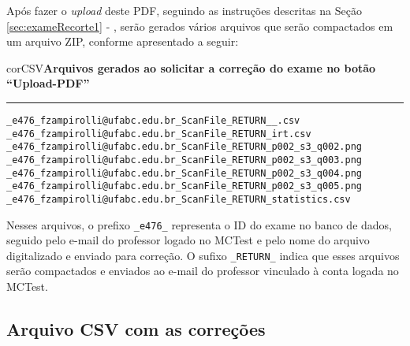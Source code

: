 
Após fazer o \textit{upload} deste PDF, seguindo as instruções descritas na Seção \ref{sec:exameRecorte1} - , serão gerados vários arquivos que serão compactados em um arquivo ZIP, conforme apresentado a seguir:

\begin{myboxCode}{corCSV}{\textbf{Arquivos gerados ao solicitar a correção do exame no botão ``Upload-PDF''}}\vspace{3mm}
\hrule
\begin{verbatim}
_e476_fzampirolli@ufabc.edu.br_ScanFile_RETURN__.csv
_e476_fzampirolli@ufabc.edu.br_ScanFile_RETURN_irt.csv
_e476_fzampirolli@ufabc.edu.br_ScanFile_RETURN_p002_s3_q002.png
_e476_fzampirolli@ufabc.edu.br_ScanFile_RETURN_p002_s3_q003.png
_e476_fzampirolli@ufabc.edu.br_ScanFile_RETURN_p002_s3_q004.png
_e476_fzampirolli@ufabc.edu.br_ScanFile_RETURN_p002_s3_q005.png
_e476_fzampirolli@ufabc.edu.br_ScanFile_RETURN_statistics.csv
\end{verbatim}
\end{myboxCode}

Nesses arquivos, o prefixo \verb|_e476_| representa o ID do exame no banco de dados, seguido pelo e-mail do professor logado no MCTest e pelo nome do arquivo digitalizado e enviado para correção. O sufixo \verb|_RETURN_| indica que esses arquivos serão compactados e enviados ao e-mail do professor vinculado à conta logada no MCTest. 

\subsection{Arquivo CSV com as correções}\label{sec:CSVcorrecoesQR}

